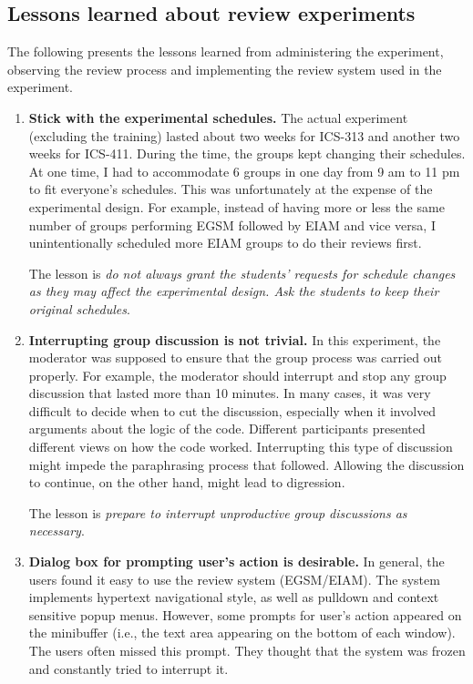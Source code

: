 \subsection {Lessons learned about review experiments}
The following presents the lessons learned from
administering the experiment, observing the review process and
implementing the review system used in the experiment.
\begin{enumerate}
\item {\bf Stick with the experimental schedules.}
The actual experiment (excluding the training) lasted about two weeks
for ICS-313 and another two weeks for ICS-411. During the time,
the groups kept changing their schedules. 
At one time, I had to accommodate 6 groups in one day from 9 am to
11 pm to fit everyone's schedules. This was unfortunately at the
expense of the experimental design.
For example, instead of having more or less the
same number of groups performing EGSM followed by EIAM and vice versa,
I unintentionally scheduled more EIAM groups to do their
reviews first.

The lesson is {\it do not always grant the students' requests for schedule
changes as they may affect the experimental design.
Ask the students to keep their original schedules}.

\item {\bf Interrupting group discussion is not trivial.}
In this experiment, the moderator was supposed to ensure that the
group process was 
carried out properly. For example, the moderator should interrupt and
stop any group discussion that lasted more than 10 minutes.
In many cases, it was very difficult to decide when to
cut the discussion, especially when it involved arguments about the
logic of the code. Different participants presented different views
on how the code worked. Interrupting this type of discussion
might impede the paraphrasing process that followed. Allowing the
discussion to continue, on the other hand, might lead to digression.

The lesson is {\it prepare to interrupt unproductive group
discussions as necessary}. 

\item {\bf Dialog box for prompting user's action is desirable.}
In general, the users found it easy to use the review system
(EGSM/EIAM). The system implements hypertext navigational style, as
well as pulldown and context sensitive popup menus. 
However, some prompts for user's action appeared on the
minibuffer (i.e., the text area appearing on the bottom of each window).
The users often missed this prompt. They thought that the system was
frozen and constantly tried to interrupt it.


\end{enumerate}
